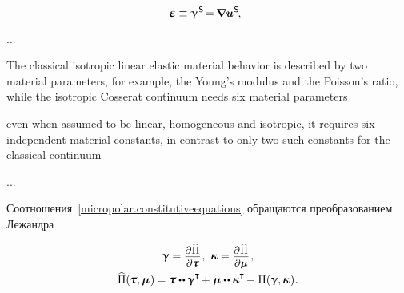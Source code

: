 \begin{otherlanguage}{russian}
\begin{equation*}
\infinitesimaldeformation \equiv \distortiontensor^{\hspace{.2ex}\mathsf{S}} \hspace{-0.32ex} = \hspace{-0.2ex} \boldnabla {\fieldofdisplacements}^{\hspace{.1ex}\mathsf{S}} \hspace{-0.25ex} , \:\:
\end{equation*}

...

{\small%
The classical isotropic linear elastic material behavior is described by two material parameters, for example, the Young’s modulus and the Poisson’s ratio, while the isotropic Cosserat continuum needs six material parameters

even when assumed to be linear, homogeneous and isotropic, it requires six independent material constants, in contrast to only two such constants for the classical continuum
\par}

...

Соотношения~\eqref{micropolar.constitutiveequations} обращаются преобразованием Лежандра

\nopagebreak\vspace{-0.2em}\begin{equation}
\begin{array}{c}
\distortiontensor = \scalebox{0.92}[0.92]{$ \displaystyle \frac{\raisemath{-0.125em}{\partial\hspace{.1ex} \widehat{\potential}^{\mathstrut}}}{\partial \forcestresstensor}$}
\hspace{.15ex} ,
\hspace{.8ex}
\wrynesstensor = \scalebox{0.92}[0.92]{$ \displaystyle \frac{\raisemath{-0.125em}{\partial\hspace{.1ex} \widehat{\potential}^{\mathstrut}}}{\partial \couplestresstensor}$}
\hspace{.2ex} ,
\\[.8em]
%
\widehat{\potential}(\hspace{-0.1ex} \forcestresstensor, \couplestresstensor \hspace{.12ex}) \hspace{-0.12ex}
= \forcestresstensor \dotdotp \distortiontensor^{\T} \hspace{-0.25ex}
+ \hspace{.1ex} \couplestresstensor \dotdotp \wrynesstensor^{\T} \hspace{-0.2ex}
- \hspace{.1ex} \potential(\distortiontensor , \wrynesstensor \hspace{.12ex})
\hspace{.1ex} .
\end{array}
\end{equation}


\end{otherlanguage}
